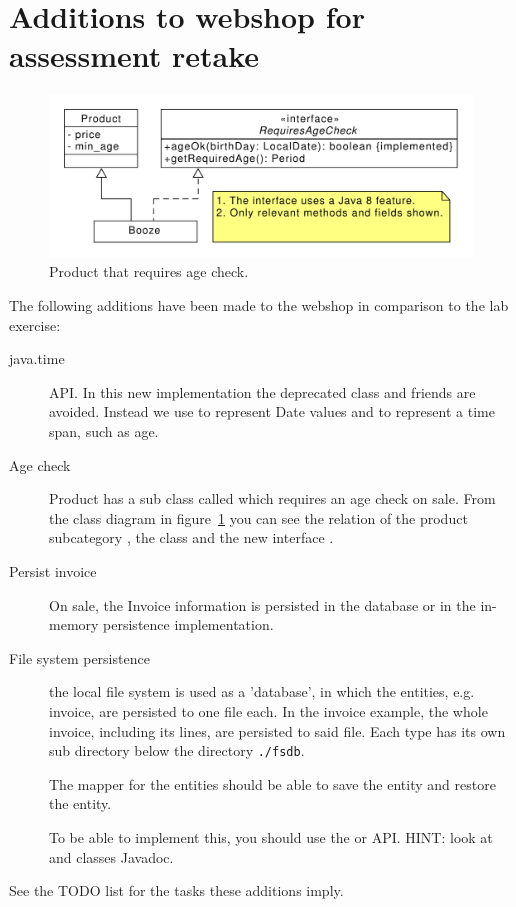 \section[Additions for retake]{Additions to webshop for assessment retake}
\begin{figure}[htbp]%
\centering
\includegraphics[width=.8\linewidth]{figures/booze.pdf}
\caption{\label{fig:booze}Product that requires age check.}
\end{figure}

The following additions have been made to the webshop in comparison to
the lab exercise:
\begin{description}
\item[java.time] API. In this new implementation the deprecated
  \sout{} class and friends are avoided. Instead we use
   to represent Date values and  to
  represent a time span, such as age.
\item[Age check] Product has a sub class called  which
  requires an age check on sale. From the class diagram in
  figure~\ref{fig:booze} you can see the relation of the product
  subcategory , the  class and the new
  interface .
\item[Persist invoice] On sale, the Invoice information is persisted in the database or
  in the in-memory persistence  implementation.
\item[File system persistence]
  the local  file system is used as a 'database', in which the entities, e.g. invoice, are
  persisted to one file each. In the invoice example, the whole
  invoice, including its lines, are persisted to said file.
  Each type has its own sub directory below the directory
  \texttt{./fsdb}.
  
  The mapper for the entities should be able to save the entity and
  restore the entity.

  To be able to implement this, you should use the  or 
  API. HINT: look at  and
   classes Javadoc.
  
\end{description}
See the TODO list for the tasks these additions imply.


